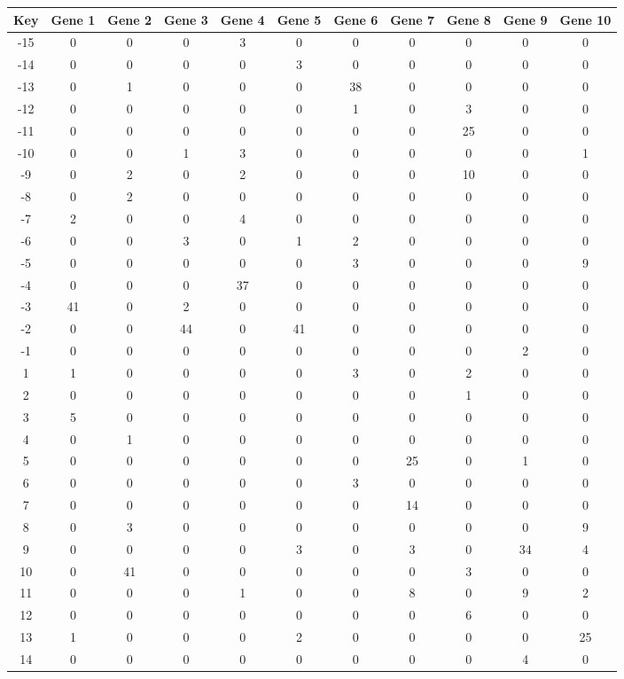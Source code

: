 \begin{tabular}{|c|c|c|c|c|c|c|c|c|c|c|}
\hline
Key & Gene 1 & Gene 2 & Gene 3 & Gene 4 & Gene 5 & Gene 6 & Gene 7 & Gene 8 & Gene 9 & Gene 10 \\
\hline
-15 & 0 & 0 & 0 & 3 & 0 & 0 & 0 & 0 & 0 & 0 \\
-14 & 0 & 0 & 0 & 0 & 3 & 0 & 0 & 0 & 0 & 0 \\
-13 & 0 & 1 & 0 & 0 & 0 & 38 & 0 & 0 & 0 & 0 \\
-12 & 0 & 0 & 0 & 0 & 0 & 1 & 0 & 3 & 0 & 0 \\
-11 & 0 & 0 & 0 & 0 & 0 & 0 & 0 & 25 & 0 & 0 \\
-10 & 0 & 0 & 1 & 3 & 0 & 0 & 0 & 0 & 0 & 1 \\
-9 & 0 & 2 & 0 & 2 & 0 & 0 & 0 & 10 & 0 & 0 \\
-8 & 0 & 2 & 0 & 0 & 0 & 0 & 0 & 0 & 0 & 0 \\
-7 & 2 & 0 & 0 & 4 & 0 & 0 & 0 & 0 & 0 & 0 \\
-6 & 0 & 0 & 3 & 0 & 1 & 2 & 0 & 0 & 0 & 0 \\
-5 & 0 & 0 & 0 & 0 & 0 & 3 & 0 & 0 & 0 & 9 \\
-4 & 0 & 0 & 0 & 37 & 0 & 0 & 0 & 0 & 0 & 0 \\
-3 & 41 & 0 & 2 & 0 & 0 & 0 & 0 & 0 & 0 & 0 \\
-2 & 0 & 0 & 44 & 0 & 41 & 0 & 0 & 0 & 0 & 0 \\
-1 & 0 & 0 & 0 & 0 & 0 & 0 & 0 & 0 & 2 & 0 \\
1 & 1 & 0 & 0 & 0 & 0 & 3 & 0 & 2 & 0 & 0 \\
2 & 0 & 0 & 0 & 0 & 0 & 0 & 0 & 1 & 0 & 0 \\
3 & 5 & 0 & 0 & 0 & 0 & 0 & 0 & 0 & 0 & 0 \\
4 & 0 & 1 & 0 & 0 & 0 & 0 & 0 & 0 & 0 & 0 \\
5 & 0 & 0 & 0 & 0 & 0 & 0 & 25 & 0 & 1 & 0 \\
6 & 0 & 0 & 0 & 0 & 0 & 3 & 0 & 0 & 0 & 0 \\
7 & 0 & 0 & 0 & 0 & 0 & 0 & 14 & 0 & 0 & 0 \\
8 & 0 & 3 & 0 & 0 & 0 & 0 & 0 & 0 & 0 & 9 \\
9 & 0 & 0 & 0 & 0 & 3 & 0 & 3 & 0 & 34 & 4 \\
10 & 0 & 41 & 0 & 0 & 0 & 0 & 0 & 3 & 0 & 0 \\
11 & 0 & 0 & 0 & 1 & 0 & 0 & 8 & 0 & 9 & 2 \\
12 & 0 & 0 & 0 & 0 & 0 & 0 & 0 & 6 & 0 & 0 \\
13 & 1 & 0 & 0 & 0 & 2 & 0 & 0 & 0 & 0 & 25 \\
14 & 0 & 0 & 0 & 0 & 0 & 0 & 0 & 0 & 4 & 0 \\
\hline
\end{tabular}